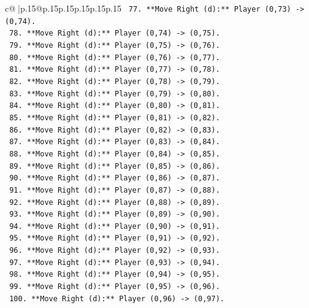 \documentclass{article}
\begin{document}
{\begin{supertabular}{c@{$\;$}|p{.15\linewidth}@{}p{.15\linewidth}p{.15\linewidth}p{.15\linewidth}p{.15\linewidth}p{.15\linewidth}}
{{{\texttt{        77. **Move Right (d):** Player (0,73) {-}> (0,74).} \\
\texttt{        78. **Move Right (d):** Player (0,74) {-}> (0,75).} \\
\texttt{        79. **Move Right (d):** Player (0,75) {-}> (0,76).} \\
\texttt{        80. **Move Right (d):** Player (0,76) {-}> (0,77).} \\
\texttt{        81. **Move Right (d):** Player (0,77) {-}> (0,78).} \\
\texttt{        82. **Move Right (d):** Player (0,78) {-}> (0,79).} \\
\texttt{        83. **Move Right (d):** Player (0,79) {-}> (0,80).} \\
\texttt{        84. **Move Right (d):** Player (0,80) {-}> (0,81).} \\
\texttt{        85. **Move Right (d):** Player (0,81) {-}> (0,82).} \\
\texttt{        86. **Move Right (d):** Player (0,82) {-}> (0,83).} \\
\texttt{        87. **Move Right (d):** Player (0,83) {-}> (0,84).} \\
\texttt{        88. **Move Right (d):** Player (0,84) {-}> (0,85).} \\
\texttt{        89. **Move Right (d):** Player (0,85) {-}> (0,86).} \\
\texttt{        90. **Move Right (d):** Player (0,86) {-}> (0,87).} \\
\texttt{        91. **Move Right (d):** Player (0,87) {-}> (0,88).} \\
\texttt{        92. **Move Right (d):** Player (0,88) {-}> (0,89).} \\
\texttt{        93. **Move Right (d):** Player (0,89) {-}> (0,90).} \\
\texttt{        94. **Move Right (d):** Player (0,90) {-}> (0,91).} \\
\texttt{        95. **Move Right (d):** Player (0,91) {-}> (0,92).} \\
\texttt{        96. **Move Right (d):** Player (0,92) {-}> (0,93).} \\
\texttt{        97. **Move Right (d):** Player (0,93) {-}> (0,94).} \\
\texttt{        98. **Move Right (d):** Player (0,94) {-}> (0,95).} \\
\texttt{        99. **Move Right (d):** Player (0,95) {-}> (0,96).} \\
\texttt{        100. **Move Right (d):** Player (0,96) {-}> (0,97).} \\
}}}
\end{supertabular}}
\end{document}
